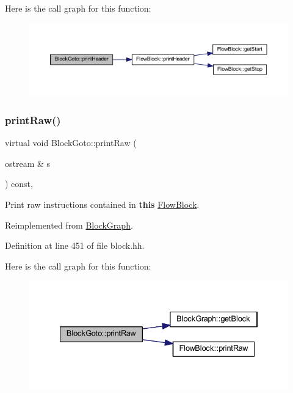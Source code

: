 Here is the call graph for this function\+:
\nopagebreak
\begin{figure}[H]
\begin{center}
\leavevmode
\includegraphics[width=350pt]{class_block_goto_a01f0af5a9043ec72c96e3f2591d0c469_cgraph}
\end{center}
\end{figure}
\mbox{\label{class_block_goto_aa665d1bc9ba041f0c90c52322abf5727}} 
\subsubsection{\texorpdfstring{printRaw()}{printRaw()}}
{\footnotesize\ttfamily virtual void Block\+Goto\+::print\+Raw (\begin{DoxyParamCaption}\item[{ostream \&}]{s }\end{DoxyParamCaption}) const\hspace{0.3cm}{\ttfamily [inline]}, {\ttfamily [virtual]}}



Print raw instructions contained in {\bfseries{this}} \mbox{\hyperlink{class_flow_block}{Flow\+Block}}. 



Reimplemented from \mbox{\hyperlink{class_block_graph_abcae771fc675bcc52c78b2f1dc0ab98a}{Block\+Graph}}.



Definition at line 451 of file block.\+hh.

Here is the call graph for this function\+:
\nopagebreak
\begin{figure}[H]
\begin{center}
\leavevmode
\includegraphics[width=334pt]{class_block_goto_aa665d1bc9ba041f0c90c52322abf5727_cgraph}
\end{center}
\end{figure}
\mbox{\label{class_block_goto_a4210ef977a85a74b9923e405057b093b}} 
